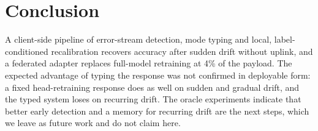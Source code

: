 \documentclass[journal]{IEEEtran}
\begin{document}
\section{Conclusion}
A client-side pipeline of error-stream detection, mode typing and local, label-conditioned recalibration recovers accuracy after sudden drift without uplink, and a federated adapter replaces full-model retraining at 4\% of the payload. The expected advantage of typing the response was not confirmed in deployable form: a fixed head-retraining response does as well on sudden and gradual drift, and the typed system loses on recurring drift. The oracle experiments indicate that better early detection and a memory for recurring drift are the next steps, which we leave as future work and do not claim here.



\end{document}
